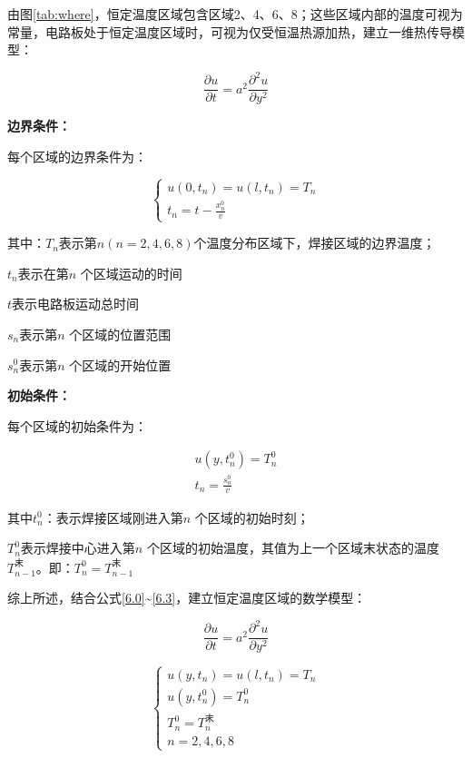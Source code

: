 \documentclass[withoutpreface,bwprint]{cumcmthesis} %
\numberwithin{equation}{subsection}
\begin{document}
由图\ref{tab:where}，恒定温度区域包含区域2、4、6、8；这些区域内部的温度可视为常量，电路板处于恒定温度区域时，可视为仅受恒温热源加热，建立一维热传导模型：

$$\frac{\partial u}{\partial t}= a^2\frac{\partial^2 u}{\partial y^2}$$


\noindent \textbf{边界条件：}

每个区域的边界条件为\cite{lishan2020}：

\begin{equation}
	\left\{\begin{array}{l}
		u\left(0, t_{n}\right)=u\left(l, t_{n}\right)=T_{n} \\
		t_{n}=t-\frac{x_{n}^{0}}{v}
	\end{array}\right.
	\label{6.2}
\end{equation}

\noindent 其中：$T_{n}$表示第$n (𝑛 =2,4,6,8)$个温度分布区域下，焊接区域的边界温度；

$t_{n}$表示在第$n$ 个区域运动的时间

$t$表示电路板运动总时间


$s_{n}$表示第$n$ 个区域的位置范围

$s_{n}^0$表示第$n$ 个区域的开始位置

\noindent \textbf{初始条件：}

每个区域的初始条件为：

\begin{equation}
	\begin{array}{c}
	u\left(y,t_{n}^0 \right) =T_{n}^0 \\
	t_{n}=\frac{s_{n}^0}{v}
	\end{array}
		\label{6.3}
\end{equation}

\noindent 其中$t_{n}^0$：表示焊接区域刚进入第$n$ 个区域的初始时刻；

$T_{n}^0$表示焊接中心进入第$n$ 个区域的初始温度，其值为上一个区域末状态的温度$T_{n-1}^\text{末}$。即：$T_{n}^0=T_{n-1}^\text{末}$

综上所述，结合公式\eqref{6.0}\~{}\eqref{6.3}，建立恒定温度区域的数学模型\cite{liuhaiyang2013latex}：

$$\frac{\partial u}{\partial t}= a^2\frac{\partial^2 u}{\partial y^2}$$

\begin{equation}
	\left\{ \begin{array}{l}
			u\left(y,t_{n} \right) =u\left(l,t_{n} \right)=T_{n}\\
			u\left(y,t_{n}^0 \right) =T_{n}^0\\
			T_{n}^0= T_{n}^\text{末}\\
			n=2,4,6,8
		\end{array}\right.
	\label{6.4}
\end{equation}
\end{document}
